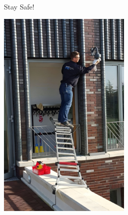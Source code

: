 \documentclass[10pt]{beamer}
\begin{document}
\begin{frame}{Stay Safe!}
    \begin{center}
        \includegraphics[width=0.48\textwidth]{img/unsafe_work.jpeg}
    \end{center}    
\end{frame}
\end{document}
